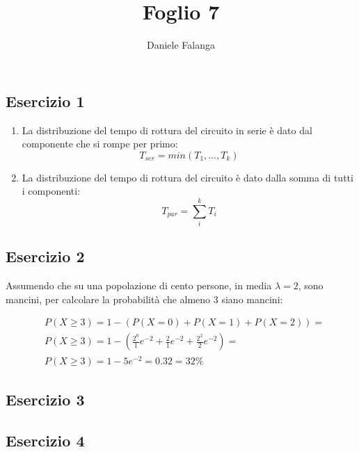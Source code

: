 \documentclass[12pt]{article}
\title{\textbf{Foglio 7}}
\author{Daniele Falanga}
\date{}
\begin{document}
\maketitle

\subsection*{Esercizio 1}

\begin{enumerate}
    \item La distribuzione del tempo di rottura del circuito in serie è dato dal componente che si rompe per primo:
    \[
    T_{ser} = min(T_1,\dots,T_k)    
    \]
    \item La distribuzione del tempo di rottura del circuito è dato dalla somma di tutti i componenti:
    \[
    T_{par} = \sum_{i}^{k}T_i    
    \]
\end{enumerate}

\subsection*{Esercizio 2}
Assumendo che su una popolazione di cento persone, in media \(\lambda = 2\), sono mancini, per calcolare la probabilità che almeno 3 siano mancini:

\begin{align*}
    &P(X \ge 3) = 1 - (P(X = 0) + P(X = 1) + P(X = 2)) = \\    
    &P(X \ge 3) = 1 - (\frac{2^0}{1}e^{-2} + \frac{2}{1}e^{-2} + \frac{2^2}{2}e^{-2}) = \\
    &P(X \ge 3) = 1-5e^{-2} = 0.32 = 32\%
\end{align*}  


\subsection*{Esercizio 3}



\subsection*{Esercizio 4}
\end{document}
